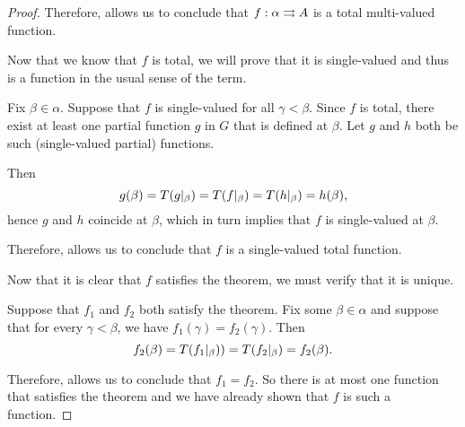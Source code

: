 \begin{proof}
  Therefore,  allows us to conclude that \( f: \alpha \rightrightarrows A \) is a total multi-valued function.

   Now that we know that \( f \) is total, we will prove that it is single-valued and thus is a function in the usual sense of the term.

  Fix \( \beta \in \alpha \). Suppose that \( f \) is single-valued for all \( \gamma < \beta \). Since \( f \) is total, there exist at least one partial function \( g \) in \( G \) that is defined at \( \beta \). Let \( g \) and \( h \) both be such (single-valued partial) functions.

  Then
  \begin{equation*}
    g(\beta) = T(g\vert_\beta) = T(f\vert_\beta) = T(h\vert_\beta) = h(\beta),
  \end{equation*}
  hence \( g \) and \( h \) coincide at \( \beta \), which in turn implies that \( f \) is single-valued at \( \beta \).

  Therefore,  allows us to conclude that \( f \) is a single-valued total function.

   Now that it is clear that \( f \) satisfies the theorem, we must verify that it is unique.

  Suppose that \( f_1 \) and \( f_2 \) both satisfy the theorem. Fix some \( \beta \in \alpha \) and suppose that for every \( \gamma < \beta \), we have \( f_1(\gamma) = f_2(\gamma) \). Then
  \begin{equation*}
    f_2(\beta) = T(f_1\vert_\beta)) = T(f_2\vert_\beta) = f_2(\beta).
  \end{equation*}

  Therefore,  allows us to conclude that \( f_1 = f_2 \). So there is at most one function that satisfies the theorem and we have already shown that \( f \) is such a function.
\end{proof}

